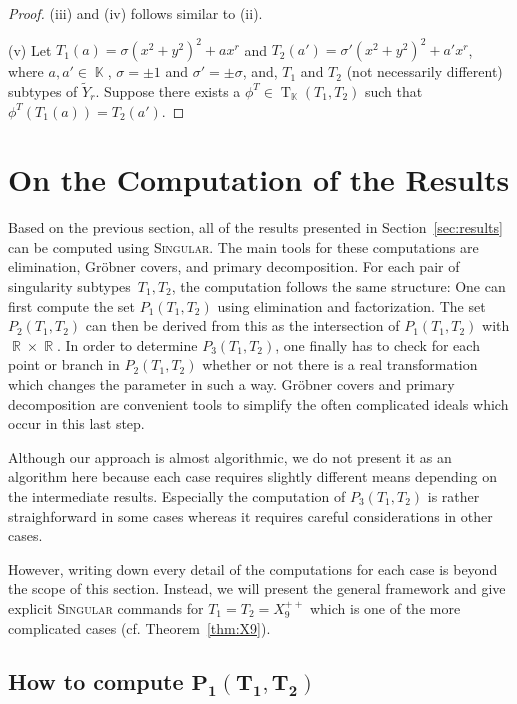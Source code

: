 \documentclass[noend]{amsproc}
\theoremstyle{definition}
\newcommand{\Singular}{\textsc{Singular}}
\DeclareMathOperator{\R}{\mathbb{R}}
\DeclareMathOperator{\K}{\mathbb{K}}
\DeclareMathOperator{\T}{T}
\begin{document}
\begin{proof}
(iii) and (iv) follows similar to (ii).

(v) Let $T_1(a)=\sigma(x^2+y^2)^2+ax^r$ and $T_2(a')=\sigma'(x^2+y^2)^2+a'x^r$,
where $a,a'\in\K$, $\sigma=\pm 1$ and $\sigma'=\pm\sigma$, and, $T_1$ and $T_2$
(not necessarily different) subtypes of $\widetilde Y_{r}$. Suppose there
exists a $\phi^T\in\T_{\K}(T_1,T_2)$ such that $\phi^T(T_1(a))=T_2(a')$.
\end{proof}


\section{On the Computation of the Results}\label{sec:computations}

Based on the previous section, all of the results presented in
Section~\ref{sec:results} can be computed using \Singular{}. The main tools for
these computations are elimination, Gr\"obner covers, and primary
decomposition. For each pair of singularity subtypes~$T_1, T_2$, the
computation follows the same structure: One can first compute the set
$P_1(T_1, T_2)$ using elimination and factorization. The set $P_2(T_1, T_2)$
can then be derived from this as the intersection of $P_1(T_1, T_2)$ with
$\R \times \R$. In order to determine $P_3(T_1, T_2)$, one finally has to check
for each point or branch in $P_2(T_1, T_2)$ whether or not there is a real
transformation which changes the parameter in such a way. Gr\"obner covers and
primary decomposition are convenient tools to simplify the often complicated
ideals which occur in this last step.

Although our approach is almost algorithmic, we do not present it as an
algorithm here because each case requires slightly different means depending on
the intermediate results. Especially the computation of $P_3(T_1, T_2)$ is
rather straighforward in some cases whereas it requires careful considerations
in other cases.

However, writing down every detail of the computations for each case is beyond
the scope of this section. Instead, we will present the general framework and
give explicit \Singular{} commands for $T_1 = T_2 = X_9^{++}$ which is one of
the more complicated cases (cf. Theorem~\ref{thm:X9}).


\subsection{How to compute $\boldsymbol{P_1(T_1, T_2)}$}%
\label{ssec:computing_P1}
\end{document}
